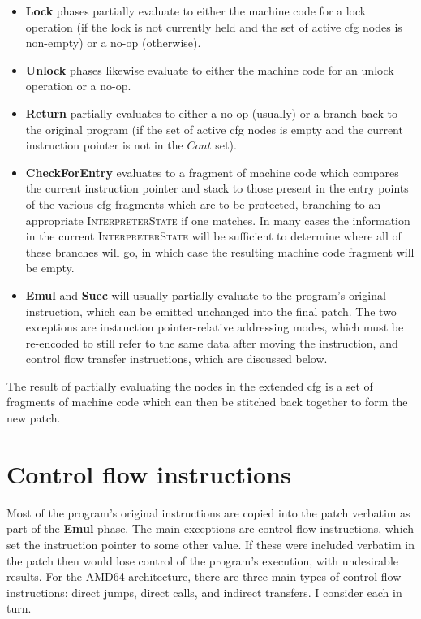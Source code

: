 \begin{itemize}
\item \textbf{Lock} phases partially evaluate to either the machine
  code for a lock operation (if the lock is not currently held and the
  set of active \gls{cfg} nodes is non-empty) or a no-op (otherwise).

\item \textbf{Unlock} phases likewise evaluate to either the machine
  code for an unlock operation or a no-op.
\item \textbf{Return} partially evaluates to either a no-op (usually)
  or a branch back to the original program (if the set of active
  \gls{cfg} nodes is empty and the current instruction pointer is not
  in the $\mathit{Cont}$ set).

\item \textbf{CheckForEntry} evaluates to a fragment of machine code
  which compares the current instruction pointer and stack to those
  present in the entry points of the various \gls{cfg} fragments which
  are to be protected, branching to an appropriate
  \textsc{InterpreterState} if one matches.  In many cases the
  information in the current \textsc{InterpreterState} will be
  sufficient to determine where all of these branches will go, in
  which case the resulting machine code fragment will be empty.

\item \textbf{Emul} and \textbf{Succ} will usually partially evaluate
  to the program's original instruction, which can be emitted
  unchanged into the final patch.  The two exceptions are instruction
  pointer-relative addressing modes, which must be re-encoded to still
  refer to the same data after moving the instruction, and control
  flow transfer instructions, which are discussed below.
\end{itemize}

The result of partially evaluating the nodes in the extended \gls{cfg} is a
set of fragments of machine code which can then be stitched back
together to form the new patch.

\section{Control flow instructions}

Most of the program's original instructions are copied into the patch
verbatim as part of the \textbf{Emul} phase.  The main exceptions are
control flow instructions, which set the instruction pointer to some
other value.  If these were included verbatim in the patch then
{\implementation} would lose control of the program's execution, with
undesirable results.  For the AMD64 architecture, there are three main
types of control flow instructions: direct jumps, direct calls, and
indirect transfers.  I consider each in turn.

